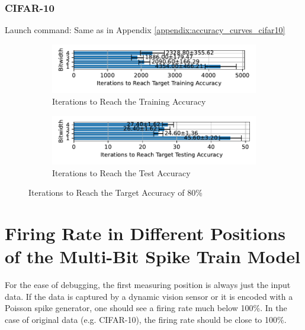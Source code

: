     \subsection{CIFAR-10}
    \label{appendix:iterations_cifar10}
        Launch command: Same as in Appendix \ref{appendix:accuracy_curves_cifar10}
        \begin{figure}[H]
            \centering
            \begin{subfigure}[H]{0.6\textwidth}
                \centering
                \includegraphics[width=\textwidth]{../standard/CIFAR10/plots/cifar10_train_iters_horizontal.pdf}
                \caption{Iterations to Reach the Training Accuracy}
            \end{subfigure}
            \hfill
            \begin{subfigure}[H]{0.6\textwidth}
                \centering
                \includegraphics[width=\textwidth]{../standard/CIFAR10/plots/cifar10_test_iters_horizontal.pdf}
                \caption{Iterations to Reach the Test Accuracy}
            \end{subfigure}
            \caption{Iterations to Reach the Target Accuracy of 80\%}
        \end{figure}



\chapter{Firing Rate in Different Positions of the Multi-Bit Spike Train Model}
\label{appendix:firerate}

    For the ease of debugging, the first measuring position is always just the input data. If the data is captured by a dynamic vision sensor or it is encoded with a Poisson spike generator, one should see a firing rate much below 100\%. In the case of original data (e.g. CIFAR-10), the firing rate should be close to 100\%. 

